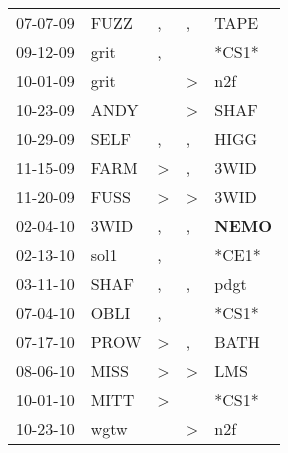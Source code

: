 \begin{supertabular}{p{0.07\textwidth}p{0.06\textwidth}p{0.02\textwidth}p{0.02\textwidth}p{0.06\textwidth}}
 07-07-09\textsuperscript{} &           FUZZ\textsuperscript{} &                , &             , &           TAPE\textsuperscript{} \\
 09-12-09\textsuperscript{} &           grit\textsuperscript{} &                , &               &                            *CS1* \\
 10-01-09\textsuperscript{} &           grit\textsuperscript{} &                  &  \textgreater &            n2f\textsuperscript{} \\
 10-23-09\textsuperscript{} &           ANDY\textsuperscript{} &                  &  \textgreater &           SHAF\textsuperscript{} \\
 10-29-09\textsuperscript{} &           SELF\textsuperscript{} &                , &             , &           HIGG\textsuperscript{} \\
 11-15-09\textsuperscript{} &           FARM\textsuperscript{} &     \textgreater &             , &           3WID\textsuperscript{} \\
 11-20-09\textsuperscript{} &           FUSS\textsuperscript{} &     \textgreater &  \textgreater &           3WID\textsuperscript{} \\
 02-04-10\textsuperscript{} &           3WID\textsuperscript{} &                , &             , &  \textbf{NEMO\textsuperscript{}} \\
 02-13-10\textsuperscript{} &           sol1\textsuperscript{} &                , &               &                            *CE1* \\
 03-11-10\textsuperscript{} &           SHAF\textsuperscript{} &                , &             , &           pdgt\textsuperscript{} \\
 07-04-10\textsuperscript{} &           OBLI\textsuperscript{} &                , &               &                            *CS1* \\
 07-17-10\textsuperscript{} &           PROW\textsuperscript{} &     \textgreater &             , &           BATH\textsuperscript{} \\
 08-06-10\textsuperscript{} &           MISS\textsuperscript{} &     \textgreater &  \textgreater &            LMS\textsuperscript{} \\
 10-01-10\textsuperscript{} &           MITT\textsuperscript{} &     \textgreater &               &                            *CS1* \\
 10-23-10\textsuperscript{} &           wgtw\textsuperscript{} &                  &  \textgreater &            n2f\textsuperscript{} \\

\end{supertabular}
